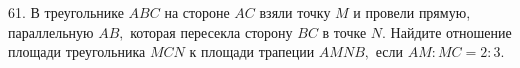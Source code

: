 61. В треугольнике $ABC$ на стороне $AC$ взяли точку $M$ и провели прямую, параллельную $AB,$ которая пересекла сторону $BC$ в точке $N.$ Найдите отношение площади треугольника $MCN$ к площади трапеции $AMNB,$ если $AM:MC=2:3.$\\
